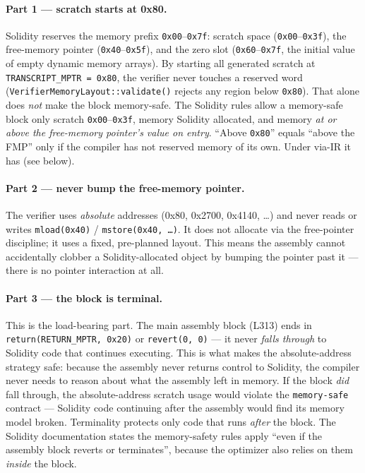 \paragraph{Part 1 --- scratch starts at 0x80.} Solidity reserves
the memory prefix \texttt{0x00}--\texttt{0x7f}: scratch space
(\texttt{0x00}--\texttt{0x3f}), the free-memory pointer
(\texttt{0x40}--\texttt{0x5f}), and the zero slot
(\texttt{0x60}--\texttt{0x7f}, the initial value of empty dynamic
memory arrays). By starting all generated scratch at
\texttt{TRANSCRIPT\_\allowbreak{}MPTR = 0x80}, the verifier never touches a
reserved word (\texttt{VerifierMemoryLayout::validate()} rejects
any region below \texttt{0x80}).  That alone does
\emph{not} make the block memory-safe. The Solidity rules allow a
memory-safe block only scratch \texttt{0x00}--\texttt{0x3f},
memory Solidity allocated, and memory \emph{at or above the
free-memory pointer's value on entry}. ``Above \texttt{0x80}''
equals ``above the FMP'' only if the compiler has not reserved
memory of its own. Under via-IR it has (see below).

\paragraph{Part 2 --- never bump the free-memory pointer.} The
verifier uses \emph{absolute} addresses (0x80, 0x2700, 0x4140,
\ldots) and never reads or writes \texttt{mload(0x40)} /
\texttt{mstore(0x40, \ldots)}. It does not allocate via the
free-pointer discipline; it uses a fixed, pre-planned layout. This
means the assembly cannot accidentally clobber a Solidity-allocated
object by bumping the pointer past it --- there is no pointer
interaction at all.

\paragraph{Part 3 --- the block is terminal.} This is the
load-bearing part. The main assembly block (L313) ends in
\texttt{return(RETURN\_\allowbreak{}MPTR, 0x20)} or \texttt{revert(0, 0)} ---
it never \emph{falls through} to Solidity code that continues
executing. This is what makes the absolute-address strategy safe:
because the assembly never returns control to Solidity, the
compiler never needs to reason about what the assembly left in
memory. If the block \emph{did} fall through, the absolute-address
scratch usage would violate the \texttt{memory-safe} contract ---
Solidity code continuing after the assembly would find its memory
model broken. Terminality protects only code that runs
\emph{after} the block. The Solidity documentation states the
memory-safety rules apply ``even if the assembly block reverts or
terminates'', because the optimizer also relies on them
\emph{inside} the block.

